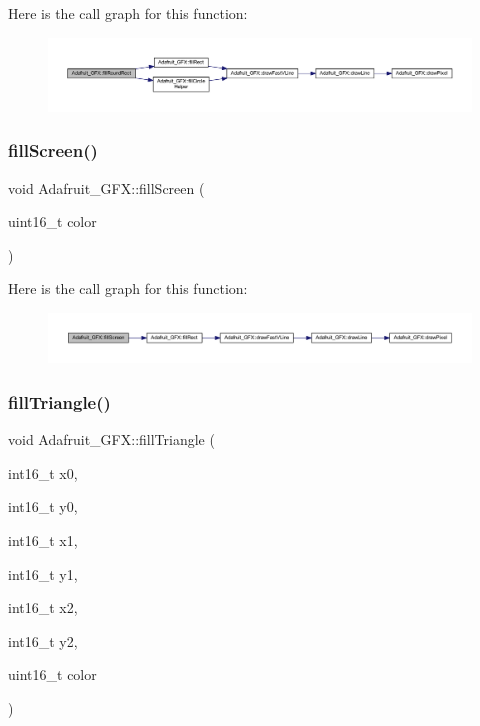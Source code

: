 Here is the call graph for this function\+:
\nopagebreak
\begin{figure}[H]
\begin{center}
\leavevmode
\includegraphics[width=350pt]{d9/d97/class_adafruit___g_f_x_a78dc59f6a508bcd3d5ac7af957b8b1ac_cgraph}
\end{center}
\end{figure}
\mbox{\label{class_adafruit___g_f_x_a2b2730aaf2208990928f9c0f85558527}} 
\subsubsection{\texorpdfstring{fill\+Screen()}{fillScreen()}}
{\footnotesize\ttfamily void Adafruit\+\_\+\+G\+F\+X\+::fill\+Screen (\begin{DoxyParamCaption}\item[{uint16\+\_\+t}]{color }\end{DoxyParamCaption})}

Here is the call graph for this function\+:
\nopagebreak
\begin{figure}[H]
\begin{center}
\leavevmode
\includegraphics[width=350pt]{d9/d97/class_adafruit___g_f_x_a2b2730aaf2208990928f9c0f85558527_cgraph}
\end{center}
\end{figure}
\mbox{\label{class_adafruit___g_f_x_a4cd646a3d9c9d5b3ee50010d0aa387cd}} 
\subsubsection{\texorpdfstring{fill\+Triangle()}{fillTriangle()}}
{\footnotesize\ttfamily void Adafruit\+\_\+\+G\+F\+X\+::fill\+Triangle (\begin{DoxyParamCaption}\item[{int16\+\_\+t}]{x0,  }\item[{int16\+\_\+t}]{y0,  }\item[{int16\+\_\+t}]{x1,  }\item[{int16\+\_\+t}]{y1,  }\item[{int16\+\_\+t}]{x2,  }\item[{int16\+\_\+t}]{y2,  }\item[{uint16\+\_\+t}]{color }\end{DoxyParamCaption})}

